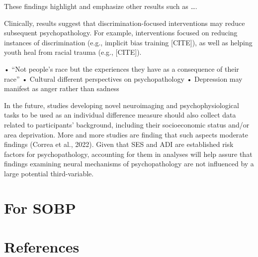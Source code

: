 \documentclass[
  man]{apa7}
\begin{document}
These findings highlight and emphasize other results such as \ldots.

Clinically, results suggest that discrimination-focused interventions may reduce subsequent psychopathology. For example, interventions focused on reducing instances of discrimination (e.g., implicit bias training {[}CITE{]}), as well as helping youth heal from racial trauma (e.g., {[}CITE{]}).

• ``Not people's race but the experiences they have as a consequence of their race'' • Cultural different perspectives on psychopathology • Depression may manifest as anger rather than sadness

In the future, studies developing novel neuroimaging and psychophysiological tasks to be used as an individual difference measure should also collect data related to participants' background, including their socioeconomic status and/or area deprivation. More and more studies are finding that such aspects moderate findings (Correa et al., 2022). Given that SES and ADI are established risk factors for psychopathology, accounting for them in analyses will help assure that findings examining neural mechanisms of psychopathology are not influenced by a large potential third-variable.

\newpage

\hypertarget{for-sobp}{%
\section{For SOBP}\label{for-sobp}}

\hypertarget{references}{%
\section{References}\label{references}}
\end{document}
